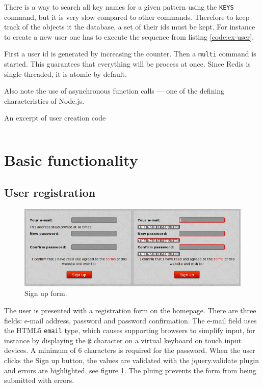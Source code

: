 \documentclass[12pt,oneside]{fithesis}
\begin{document}
	There is a way to search all key names for a given pattern using the \texttt{KEYS} command, but it is very slow compared to other commands. Therefore to keep track of the objects it the database, a set of their ids must be kept. For instance to create a new user one has to execute the sequence from listing \ref{code:ex-user}.
	
	First a user id is generated by increasing the counter. Then a \texttt{multi} command is started. This guarantees that everything will be process at once. Since Redis is single-threaded, it is atomic by default.
	
	Also note the use of asynchronous function calls --- one of the defining characteristics of Node.js.
	\begin{program}[h!]
	\caption{An excerpt of user creation code}
	\label{code:ex-user}
	\inputminted[fontsize=\footnotesize, linenos=false]{javascript}{ex-user.js}
	\end{program}
	
	
\section{Basic functionality}
	\subsection{User registration}	
	  \begin{figure}[h]
	  \centering
	    \includegraphics[width=1.0\textwidth]{screen-signup.png}
		  \caption{Sign up form.}
		  \label{fig:screen-signup}
	  \end{figure}
		The user is presented with a registration form on the homepage. There are three fields: e-mail address, password and password confirmation. The e-mail field uses the HTML5 \texttt{email} type, which causes supporting browsers to simplify input, for instance by displaying the \texttt{@} character on a virtual keyboard on touch input devices. A minimum of 6 characters is required for the password. When the user clicks the Sign up button, the values are validated with the jquery.validate plugin and errors are highlighted, see figure \ref{fig:screen-signup}. The pluing prevents the form from being submitted with errors.
		
\end{document}
